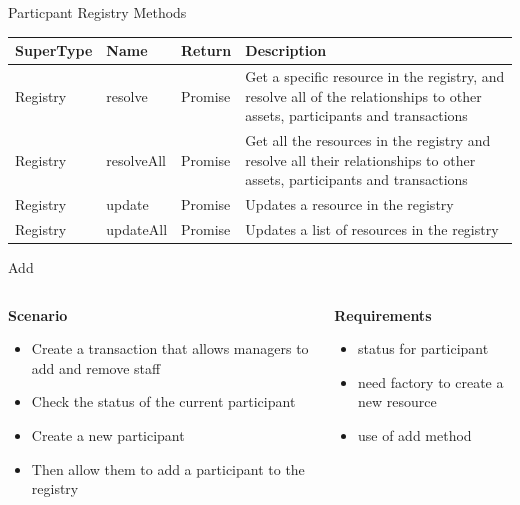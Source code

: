 \documentclass[pdf,table]{beamer}
\begin{document}
\begin{frame}{Particpant Registry Methods}
	\begin{tabular}{lllp{65mm}} \\
		SuperType & Name & Return & Description \\ \hline
			Registry & resolve & Promise & Get a specific resource in the registry, and resolve all of the relationships to other assets, participants and transactions \\ \hline
		Registry & resolveAll & Promise & Get all the resources in the registry and resolve all their relationships to other assets, participants and transactions \\ \hline
		Registry & update & Promise & Updates a resource in the registry \\ \hline
		Registry & updateAll & Promise & Updates a list of resources in the registry \\ \hline
	\end{tabular}
\end{frame}



\begin{frame}{Add }
	\begin{columns}[T]
		\begin{column}{0.48\textwidth}
			{\bf Scenario}
			\begin{itemize}
				\item Create a transaction that allows managers to add and remove staff
				\item Check the status of the current participant
				\item Create a new participant
				\item Then allow them to add a participant to the registry
			\end{itemize}
		\end{column}
		\begin{column}{0.48\textwidth}
			{\bf Requirements}
			\begin{itemize}
				\item status for participant
				\item need factory to create a new resource
				\item use of add method
			\end{itemize}
		\end{column}
	\end{columns}	
\end{frame}
\end{document}
